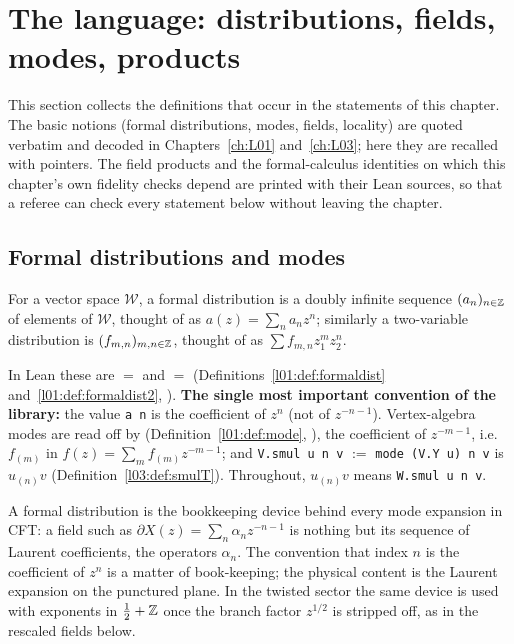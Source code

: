 \section{The language: distributions, fields, modes, products}\label{ch07:sec:language}

This section collects the definitions that occur in the statements of this chapter. The basic
notions (formal distributions, modes, fields, locality) are quoted verbatim and decoded in
Chapters~\ref{ch:L01} and~\ref{ch:L03}; here they are recalled with pointers. The field products
and the formal-calculus identities on which this chapter's own fidelity checks depend are printed
with their Lean sources, so that a referee can check every statement below without leaving the
chapter.

\subsection{Formal distributions and modes}\label{ch07:sec:modes}

\begin{definition}\label{ch07:def:formaldist}
For a vector space $\mathcal W$, a formal distribution is a doubly infinite sequence
$(a_n)_{n\in{\mathbb{Z}}}$ of elements of $\mathcal W$, thought of as $a(z) = \sum_n a_n z^n$; similarly a
two-variable distribution is $(f_{m,n})_{m,n\in{\mathbb{Z}}}$, thought of as $\sum f_{m,n}z_1^m z_2^n$.
\end{definition}

In Lean these are  $=$  and  $=$
 (Definitions~\ref{l01:def:formaldist} and~\ref{l01:def:formaldist2},
).
\textbf{The single most important convention of the library:} the value \verb|a n| is the
coefficient of $z^{n}$ (not of $z^{-n-1}$). Vertex-algebra modes are read off by
 (Definition~\ref{l01:def:mode},
), the coefficient of $z^{-m-1}$, i.e.\ $f_{(m)}$ in
$f(z) = \sum_m f_{(m)} z^{-m-1}$; and \verb|V.smul u n v| $:=$ \verb|mode (V.Y u) n v| is
$u_{(n)}v$ (Definition~\ref{l03:def:smulT}). Throughout, $u_{(n)}v$ means \verb|W.smul u n v|.

\begin{physics}
A formal distribution is the bookkeeping device behind every mode expansion in CFT: a field such as $\partial X(z)=\sum_n\alpha_nz^{-n-1}$ is nothing but its sequence of Laurent coefficients, the operators $\alpha_n$. The convention that index $n$ is the coefficient of $z^n$ is a matter of book-keeping; the physical content is the Laurent expansion on the punctured plane. In the twisted sector the same device is used with exponents in $\tfrac12+{\mathbb{Z}}$ once the branch factor $z^{1/2}$ is stripped off, as in the rescaled fields below.
\end{physics}

